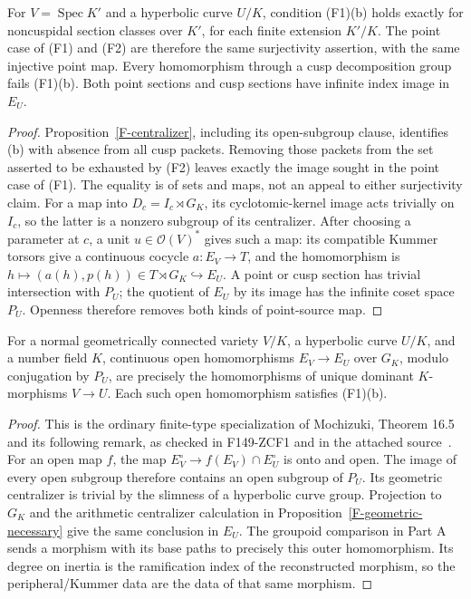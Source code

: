\begin{proposition}
\label{F-point-equivalence}
For $V=\operatorname{Spec}K'$ and a hyperbolic curve $U/K$, condition
(F1)(b) holds exactly for noncuspidal section classes over $K'$, for
each finite extension $K'/K$. The point case of (F1) and (F2) are
therefore the same surjectivity assertion, with the same injective
point map. Every homomorphism through a cusp decomposition group
fails (F1)(b). Both point sections and cusp sections have infinite
index image in $E_U$.
\end{proposition}
\begin{proof}
Proposition~\ref{F-centralizer}, including its open-subgroup clause,
identifies (b) with absence from all cusp packets. Removing those
packets from the set asserted to be exhausted by (F2) leaves exactly
the image sought in the point case of (F1). The equality is of sets
and maps, not an appeal to either surjectivity claim. For a map into
$D_c=I_c\rtimes G_K$, its cyclotomic-kernel image acts trivially on
$I_c$, so the latter is a nonzero subgroup of its centralizer.
After choosing a parameter at $c$, a unit $u\in\mathcal O(V)^*$
gives such a map: its compatible Kummer torsors give a continuous
cocycle $a:E_V\to T$, and the homomorphism is
$h\mapsto(a(h),p(h))\in T\rtimes G_K\hookrightarrow E_U$.
A point or cusp section has trivial intersection with $P_U$;
the quotient of $E_U$ by its image has the infinite coset space
$P_U$. Openness therefore removes both kinds of point-source map.
\end{proof}

\begin{proposition}
\label{F-open-Hom}
For a normal geometrically connected variety $V/K$, a hyperbolic
curve $U/K$, and a number field $K$, continuous open homomorphisms
$E_V\to E_U$ over $G_K$, modulo conjugation by $P_U$, are precisely
the homomorphisms of unique dominant $K$-morphisms $V\to U$.
Each such open homomorphism satisfies (F1)(b).
\end{proposition}
\begin{proof}
This is the ordinary finite-type specialization of Mochizuki,
Theorem 16.5 and its following remark, as checked in F149-ZCF1
and in the attached source~\cite{F-Mochizuki}. For an open map $f$,
the map $E_V^{\circ}\to f(E_V)\cap E_U^{\circ}$ is onto and open.
The image of every open subgroup therefore contains an open
subgroup of $P_U$. Its geometric centralizer is trivial by the
slimness of a hyperbolic curve group. Projection to $G_K$ and the
arithmetic centralizer calculation in
Proposition~\ref{F-geometric-necessary} give the same conclusion in
$E_U$. The groupoid comparison in Part A sends a morphism with its
base paths to precisely this outer homomorphism. Its degree on
inertia is the ramification index of the reconstructed morphism,
so the peripheral/Kummer data are the data of that same morphism.
\end{proof}

